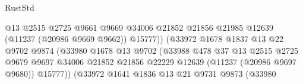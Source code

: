 \begin{lexlean}{RustStd}
\begin{coremodule}
                                                  @13
                                                  @2515
                                                  @2725
                                                  @9661
                                                  @9669
                                                  @34006
                                                  @21852
                                                  @21856
                                                  @21985
                                                  @12639
                                                  (@11237 (@20986 @9669 @9662))
                                                  @15777))
                                              (@33972
                                                @1678
                                                @1837
                                                @13
                                                @22
                                                @9702
                                                @9874
                                                (@33980
                                                  @1678
                                                  @13
                                                  @9702
                                                  (@33988
                                                    @478
                                                    @37
                                                    @13
                                                    @2515
                                                    @2725
                                                    @9679
                                                    @9697
                                                    @34006
                                                    @21852
                                                    @21856
                                                    @22229
                                                    @12639
                                                    (@11237 (@20986 @9697 @9680))
                                                    @15777))
                                                (@33972
                                                  @1641
                                                  @1836
                                                  @13
                                                  @21
                                                  @9731
                                                  @9873
                                                  (@33980

\end{coremodule}
\end{lexlean}
